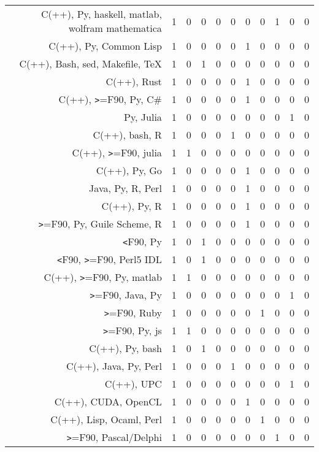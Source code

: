 {\begin{landscape}
\begin{longtable}[htb]{r|c|c|c|c|c|c|c|c|c|c}
{C(++), Py, haskell, matlab, wolfram mathematica} & 1 & 0 & 0 & 0 & 0 & 0 & 0 & 1 & 0 & 0 \\%
{C(++), Py, Common Lisp} & 1 & 0 & 0 & 0 & 0 & 1 & 0 & 0 & 0 & 0 \\%
{C(++), Bash, sed, Makefile, TeX} & 1 & 0 & 1 & 0 & 0 & 0 & 0 & 0 & 0 & 0 \\%
{C(++), Rust} & 1 & 0 & 0 & 0 & 0 & 1 & 0 & 0 & 0 & 0 \\%
{C(++), \verb!>!=F90, Py, C\#} & 1 & 0 & 0 & 0 & 0 & 1 & 0 & 0 & 0 & 0 \\%
{Py, Julia} & 1 & 0 & 0 & 0 & 0 & 0 & 0 & 0 & 1 & 0 \\%
{C(++), bash, R} & 1 & 0 & 0 & 0 & 1 & 0 & 0 & 0 & 0 & 0 \\%
{C(++), \verb!>!=F90, julia} & 1 & 1 & 0 & 0 & 0 & 0 & 0 & 0 & 0 & 0 \\%
{C(++), Py, Go} & 1 & 0 & 0 & 0 & 0 & 1 & 0 & 0 & 0 & 0 \\%
{Java, Py, R, Perl} & 1 & 0 & 0 & 0 & 0 & 1 & 0 & 0 & 0 & 0 \\%
{C(++), Py, R} & 1 & 0 & 0 & 0 & 0 & 1 & 0 & 0 & 0 & 0 \\%
{\verb!>!=F90, Py, Guile Scheme, R} & 1 & 0 & 0 & 0 & 0 & 1 & 0 & 0 & 0 & 0 \\%
{\verb!<!F90, Py} & 1 & 0 & 1 & 0 & 0 & 0 & 0 & 0 & 0 & 0 \\%
{\verb!<!F90, \verb!>!=F90, Perl5 IDL} & 1 & 0 & 1 & 0 & 0 & 0 & 0 & 0 & 0 & 0 \\%
{C(++), \verb!>!=F90, Py, matlab} & 1 & 1 & 0 & 0 & 0 & 0 & 0 & 0 & 0 & 0 \\%
{\verb!>!=F90, Java, Py} & 1 & 0 & 0 & 0 & 0 & 0 & 0 & 0 & 1 & 0 \\%
{\verb!>!=F90, Ruby} & 1 & 0 & 0 & 0 & 0 & 0 & 1 & 0 & 0 & 0 \\%
{\verb!>!=F90, Py, js} & 1 & 1 & 0 & 0 & 0 & 0 & 0 & 0 & 0 & 0 \\%
{C(++), Py, bash} & 1 & 0 & 1 & 0 & 0 & 0 & 0 & 0 & 0 & 0 \\%
{C(++), Java, Py, Perl} & 1 & 0 & 0 & 0 & 1 & 0 & 0 & 0 & 0 & 0 \\%
{C(++), UPC} & 1 & 0 & 0 & 0 & 0 & 0 & 0 & 0 & 1 & 0 \\%
{C(++), CUDA, OpenCL} & 1 & 0 & 0 & 0 & 0 & 1 & 0 & 0 & 0 & 0 \\%
{C(++), Lisp, Ocaml, Perl} & 1 & 0 & 0 & 0 & 0 & 0 & 1 & 0 & 0 & 0 \\%
{\verb!>!=F90, Pascal/Delphi} & 1 & 0 & 0 & 0 & 0 & 0 & 0 & 1 & 0 & 0 \\%

\end{longtable}
\end{landscape}}

